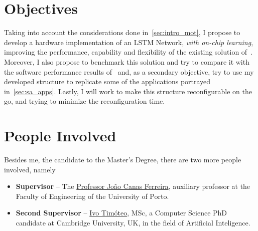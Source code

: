 \section{Objectives}\label{sec:intro_obj}
Taking into account the considerations done in~\ref{sec:intro_mot}, I propose to develop a hardware implementation of an LSTM Network, \emph{with on-chip learning}, improving the performance, capability and flexibility of the existing solution of~\cite{Chang15}. Moreover, I also propose to benchmark this solution and try to compare it with the software performance results of~\cite{Tavear13} and, as a secondary objective, try to use my developed structure to replicate some of the applications portrayed in~\ref{sec:sa_apps}. Lastly, I will work to make this structure reconfigurable on the go, and trying to minimize the reconfiguration time.

\section{People Involved}\label{sec:intro_people}
Besides me, the candidate to the Master's Degree, there are two more people involved, namely

\begin{itemize}
    \item \textbf{Supervisor} -- The \href{https://sigarra.up.pt/feup/pt/func\_geral.formview?p\_codigo=210963}{Professor João Canas Ferreira}, auxiliary professor at the Faculty of Engineering of the University of Porto.
    \item \textbf{Second Supervisor} -- \href{http://www.cl.cam.ac.uk/~ijpdmt2/}{Ivo Timóteo}, MSc, a Computer Science PhD candidate at Cambridge University, UK, in the field of Artificial Inteligence.
\end{itemize}


